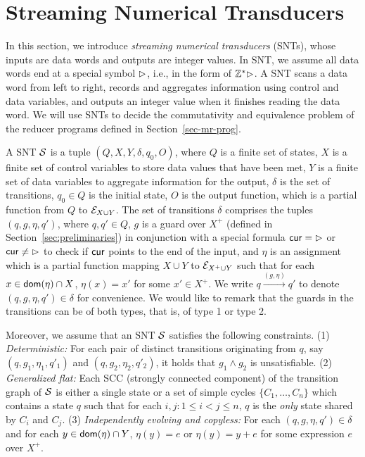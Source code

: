


\section{Streaming Numerical Transducers}\label{sec:def-snt}

In this section, we introduce \emph{streaming numerical transducers} (SNTs), whose inputs are data words and outputs are integer values. 
In SNT, we assume all data words end at a special symbol $\rhd$, i.e., in the form of ${\mathbb{Z} }^*\rhd$.
A SNT scans a data word from left to right, records and aggregates information using control and data variables, and outputs an integer value when it finishes reading the data word. We will use SNTs to decide the commutativity and equivalence problem of the reducer programs defined in Section~\ref{sec-mr-prog}. 


A SNT ${\mathcal{S} }$ is a tuple $(Q, X, Y, \delta, q_0, O)$, where $Q$ is a finite set of states, $X$ is a finite set of control variables to store data values that have been met, $Y$ is a finite set of data variables to aggregate information for the output, $\delta$ is the set of transitions, $q_0 \in Q$ is the initial state, $O$ is the output function, which is a partial function from $Q$ to ${\mathcal{E} }_{X \cup Y}$.
The set of transitions $\delta$ comprises the tuples $(q,  g, \eta, q')$, where $q,q'\in Q$, $g$ is a guard over $X^+$ (defined in Section~\ref{sec:preliminaries}) in conjunction with a special formula $\mathsf{cur}=\rhd$ or $\mathsf{cur} \neq \rhd$ to check if $\mathsf{cur}$ points to the end of the input, and $\eta$ is an assignment which is a partial function mapping $X \cup Y$  to ${\mathcal{E} }_{X^+ \cup Y}$ such that for each $x \in \mathsf{dom}(\eta) \cap X$, $\eta(x)=x'$ for some $x' \in X^+$. We write $q \xrightarrow{(g,\eta)} q'$ to denote $(q,g,\eta,q') \in \delta$ for convenience.  We would like to remark that the guards in the transitions can be of both types, that is, of type 1 or type 2.

Moreover, we assume that an SNT ${\mathcal{S} }$ satisfies the following constraints. (1) \emph{Deterministic:} For each pair of distinct transitions originating from $q$, say $(q, g_1, \eta_1,q'_1)$ and $(q, g_2,\eta_2,q'_2)$, it holds that $g_1 \wedge g_2$ is unsatisfiable. (2) \emph{Generalized flat:} Each SCC (strongly connected component) of the transition graph of ${\mathcal{S} }$ is either a single state or a set of simple cycles $\{C_1,\dots, C_n\}$ which contains a state $q$ such that for each $i,j: 1 \le i < j \le n$, $q$ is the \emph{only} state shared by $C_i$ and $C_j$. (3) \emph{Independently evolving and copyless:} For each $(q, g, \eta, q') \in \delta$ and for each $y \in \mathsf{dom}(\eta) \cap Y$, $\eta(y)=e$ or $\eta(y)=y+e$ for some expression $e$ over $X^+$.

